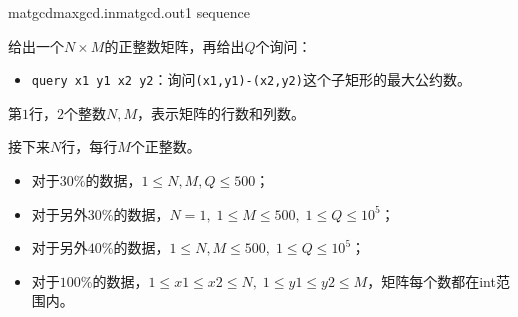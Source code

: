\documentclass[11pt,a4paper,oneside]{article}
\begin{document}
\begin{problem}{matgcd}{maxgcd.in}{matgcd.out}{1 sequence}

    给出一个$N \times M$的正整数矩阵，再给出$Q$个询问：
    \begin{itemize}
    	\item \texttt{query x1 y1 x2 y2}：询问\texttt{(x1,y1)-(x2,y2)}这个子矩形的最大公约数。
    \end{itemize}

    \InputFile

    第$1$行，$2$个整数$N, M$，表示矩阵的行数和列数。

    接下来$N$行，每行$M$个正整数。

    \OutputFile

    \Example

    \begin{example}
    \end{example}

    \Note
    \begin{itemize}
        \item 对于$30\%$的数据，$1 \leq N, M, Q \leq 500$；
        \item 对于另外$30\%$的数据，$N = 1, \; 1 \leq M \leq 500, \; 1 \leq Q \leq 10^5$；
        \item 对于另外$40\%$的数据，$1 \leq N, M \leq 500, \; 1 \leq Q \leq 10^5$；
        \item 对于$100\%$的数据，$1 \leq x1 \leq x2 \leq N, \; 1 \leq y1 \leq y2 \leq M$，矩阵每个数都在int范围内。
    \end{itemize}

\end{problem}
\end{document}

